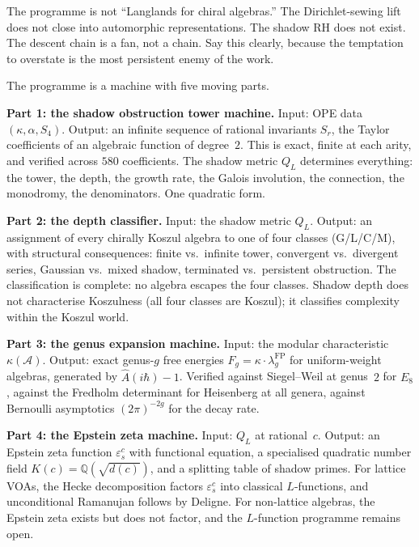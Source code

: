 \documentclass[11pt]{article}
\newcommand{\cA}{\mathcal{A}}
\newcommand{\Q}{\mathbb{Q}}
\begin{document}
The programme is not ``Langlands for chiral algebras.''  The
Dirichlet-sewing lift does not close into automorphic
representations.  The shadow RH does not exist.  The descent
chain is a fan, not a chain.  Say this clearly, because the
temptation to overstate is the most persistent enemy of the
work.

The programme is a machine with five moving parts.

\medskip

\noindent\textbf{Part 1: the shadow obstruction tower machine.}\enspace
Input: OPE data $(\kappa, \alpha, S_4)$.
Output: an infinite sequence of rational invariants $S_r$,
the Taylor coefficients of an algebraic function of degree~$2$.
This is exact, finite at each arity, and verified across
$580$ coefficients.  The shadow metric $Q_L$ determines
everything: the tower, the depth, the growth rate, the Galois
involution, the connection, the monodromy, the denominators.
One quadratic form.

\medskip

\noindent\textbf{Part 2: the depth classifier.}\enspace
Input: the shadow metric $Q_L$.
Output: an assignment of every chirally Koszul algebra to one
of four classes (G/L/C/M), with structural consequences:
finite vs.\ infinite tower, convergent vs.\ divergent series,
Gaussian vs.\ mixed shadow, terminated vs.\ persistent
obstruction.  The classification is complete: no algebra
escapes the four classes.  Shadow depth does not characterise
Koszulness (all four classes are Koszul); it classifies
complexity within the Koszul world.

\medskip

\noindent\textbf{Part 3: the genus expansion machine.}\enspace
Input: the modular characteristic $\kappa(\cA)$.
Output: exact genus-$g$ free energies
$F_g = \kappa \cdot \lambda_g^{\mathrm{FP}}$ for
uniform-weight algebras, generated by
$\hat{A}(i\hbar) - 1$.  Verified against
Siegel--Weil at genus~$2$ for $E_8$, against the
Fredholm determinant for Heisenberg at all genera, against
Bernoulli asymptotics $(2\pi)^{-2g}$ for the decay rate.

\medskip

\noindent\textbf{Part 4: the Epstein zeta machine.}\enspace
Input: $Q_L$ at rational~$c$.
Output: an Epstein zeta function $\varepsilon^c_s$ with
functional equation, a specialised quadratic number field
$K(c) = \Q(\sqrt{d(c)})$, and a splitting table of shadow
primes.  For lattice VOAs, the Hecke decomposition factors
$\varepsilon^c_s$ into classical $L$-functions, and
unconditional Ramanujan follows by Deligne.  For non-lattice
algebras, the Epstein zeta exists but does not factor, and the
$L$-function programme remains open.
\end{document}
